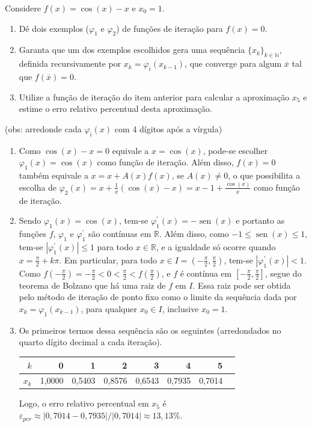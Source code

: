 \documentclass[12pt,a4paper]{article}
\newcommand*\sen{\operatorname{sen}}
\newcommand*\R{\mathbb{R}}
\begin{document}
\begin{ExerciseList}
\Exercise[title={2,5}]
Considere $f(x) = \cos(x) - x$ e $x_0 = 1$.
\begin{enumerate}
\item Dê dois exemplos ($\varphi_1$ e $\varphi_2$) de funções de iteração para $f(x) = 0$.
\item Garanta que um dos exemplos escolhidos gera uma sequência $\{x_k\}_{k \in \mathbb{N}}$, definida recursivamente por $x_k = \varphi_i(x_{k-1})$, que converge para algum $\overline{x}$ tal que $f(\overline{x}) = 0$. 
\item Utilize a função de iteração do item anterior para calcular a aproximação $x_5$ e estime o erro relativo percentual desta aproximação.
\end{enumerate}
(obs: arredonde cada $\varphi_i(x)$ com 4 dígitos após a vírgula)
\Answer \begin{enumerate}
\item Como $\cos(x) - x = 0$ equivale a $x = \cos(x)$, pode-se escolher $\varphi_1(x) = \cos(x)$ como função de iteração. Além disso, $f(x) = 0$ também equivale a $x = x + A(x) f(x)$, se $A(x) \neq 0$, o que possibilita a escolha de $\varphi_2(x) =x+\frac{1}{x} (\cos(x)-x) = x-1+\frac{\cos(x)}{x}$ como função de iteração.
\item Sendo $\varphi_1(x) = \cos(x)$, tem-se $\varphi_1^\prime(x) = -\sen(x)$ e portanto as funções $f$, $\varphi_1$ e $\varphi_1^\prime$ são contínuas em $\R$. Além disso, como $-1 \leq \sen(x) \leq 1$, tem-se $|\varphi_1^\prime(x)| \leq 1$ para todo $x \in \R$, e a igualdade só ocorre quando $x = \frac{\pi}{2} + k \pi$. Em particular, para todo $x \in I = (-\frac{\pi}{2}, \frac{\pi}{2})$, tem-se $|\varphi_1^\prime(x)| < 1$. Como $f(-\frac{\pi}{2}) = -\frac{\pi}{2} < 0 < \frac{\pi}{2} < f(\frac{\pi}{2})$, e $f$ é contínua em $[-\frac{\pi}{2}, \frac{\pi}{2}]$, segue do teorema de Bolzano que há uma raiz de $f$ em $I$. Essa raiz pode ser obtida pelo método de iteração de ponto fixo como o limite da sequência dada por $x_k = \varphi_1(x_{k-1})$, para qualquer $x_0 \in I$, inclusive $x_0 = 1$.

\item Os primeiros termos dessa sequência são os seguintes (arredondados no quarto dígito decimal a cada iteração).

\begin{center}
\begin{tabular}{|r|r|r|r|r|r|r|r|}
\hline
$k$   & 0      & 1      & 2      & 3      & 4      & 5 \\ \hline
$x_k$ & 1,0000 & 0,5403 & 0,8576 & 0,6543 & 0,7935 & 0,7014 \\ \hline
\end{tabular}
\end{center}
Logo, o erro relativo percentual em $x_5$ é $\varepsilon_{per} \approx |0,7014 - 0,7935|/|0,7014| \approx 13,13\%$.
\end{enumerate}


\end{ExerciseList}
\end{document}
